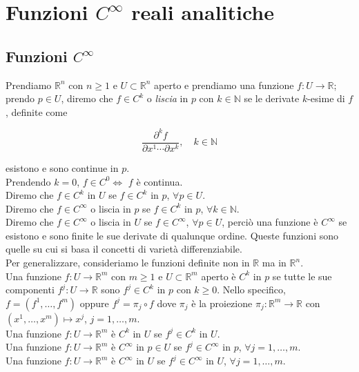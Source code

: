 \section{Funzioni $ C^{\infty} $ reali analitiche}

\subsection{Funzioni $ C^{\infty} $}

Prendiamo $ \mathbb{R}^{n} $ con $ n \geq 1 $ e $ U \subset \mathbb{R}^{n} $ aperto e prendiamo una funzione $ f : U \to \mathbb{R} $; prendo $ p \in U $, diremo che $ f \in C^{k} $ o \textit{liscia} in $ p $ con $ k \in \mathbb{N} $ se le derivate $ k $-esime di $ f $, definite come

\begin{equation}
	\dfrac{\partial^{k} f}{\partial x^{1} \cdots \partial x^{k}}, \quad k \in \mathbb{N}
\end{equation}

esistono e sono continue in $ p $.\\
Prendendo $ k = 0 $, $ f \in C^{0} \iff $ $ f $ è continua.\\
Diremo che $ f \in C^{k} $ in $ U $ se $ f \in C^{k} $ in $ p $, $ \forall p \in U $.\\
Diremo che $ f \in C^{\infty} $ o liscia in $ p $ se $ f \in C^{k} $ in $ p $, $ \forall k \in \mathbb{N} $.\\
Diremo che $ f \in C^{\infty} $ o liscia in $ U $ se $ f \in C^{\infty} $, $ \forall p \in U $, perciò una funzione è $ C^{\infty} $ se esistono e sono finite le sue derivate di qualunque ordine. Queste funzioni sono quelle su cui si basa il concetti di varietà differenziabile.\\

Per generalizzare, consideriamo le funzioni definite non in $ \mathbb{R} $ ma in $ \mathbb{R}^{n} $.\\
Una funzione $ f : U \to \mathbb{R}^{m} $ con $ m \geq 1 $ e $ U \subset \mathbb{R}^{m} $ aperto è $ C^{k} $ in $ p $ se tutte le sue componenti $ f^{j} : U \to \mathbb{R} $ sono $ f^{j} \in C^{k} $ in $ p $ con $ k \geq 0 $. Nello specifico, $ f = (f^{1}, \dots, f^{m}) $ oppure $ f^{j} = \pi_{j} \circ f $ dove $ \pi_{j} $ è la proiezione $ \pi_{j} : \mathbb{R}^{m} \to \mathbb{R} $ con $ (x^{1}, \dots, x^{m}) \mapsto x^{j} $, $ j = 1, \dots, m $.\\
Una funzione $ f : U \to \mathbb{R}^{m} $ è $ C^{k} $ in $ U $ se $ f^{j} \in C^{k} $ in $ U $.\\
Una funzione $ f : U \to \mathbb{R}^{m} $ è $ C^{\infty} $ in $ p \in U $ se $ f^{j} \in C^{\infty} $ in $ p $, $ \forall j = 1, \dots, m $.\\
Una funzione $ f : U \to \mathbb{R}^{m} $ è $ C^{\infty} $ in $ U $ se $ f^{j} \in C^{\infty} $ in $ U $, $ \forall j = 1, \dots, m $.

